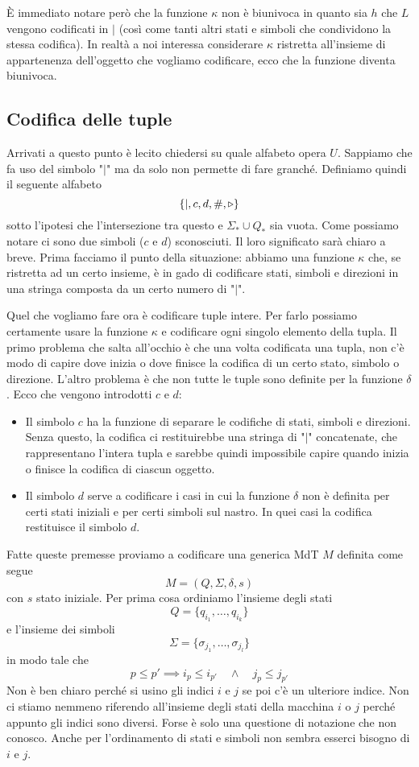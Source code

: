\`E immediato notare però che la funzione $\kappa$ non è
biunivoca in quanto sia $h$ che $L$ vengono codificati in $\mid$
(così come tanti altri stati e simboli che condividono la stessa
codifica). In realtà a noi interessa considerare $\kappa$
ristretta all'insieme di appartenenza dell'oggetto che vogliamo
codificare, ecco che la funzione diventa biunivoca.

\subsection{Codifica delle tuple}
Arrivati a questo punto è lecito chiedersi su quale alfabeto
opera $U$. Sappiamo che fa uso del simbolo "$\mid$" ma da solo
non permette di fare granché. Definiamo quindi il seguente
alfabeto
\[ \{ \mid, c, d, \#, \triangleright \} \]
sotto l'ipotesi che l'intersezione tra questo e
$\Sigma_* \cup Q_*$ sia vuota. Come possiamo notare ci sono due
simboli ($c$ e $d$) sconosciuti. Il loro significato sarà chiaro
a breve. Prima facciamo il punto della situazione: abbiamo una
funzione $\kappa$ che, se ristretta ad un certo insieme, è in
gado di codificare stati, simboli e direzioni in una stringa
composta da un certo numero di "$\mid$".

Quel che vogliamo fare ora è codificare tuple intere. Per farlo
possiamo certamente usare la funzione $\kappa$ e codificare ogni
singolo elemento della tupla. Il primo problema che salta
all'occhio è che una volta codificata una tupla, non c'è modo di
capire dove inizia o dove finisce la codifica di un certo stato,
simbolo o direzione. L'altro problema è che non tutte le tuple
sono definite per la funzione $\delta$. Ecco che vengono
introdotti $c$ e $d$:
\begin{itemize}
	\item Il simbolo $c$ ha la funzione di separare le codifiche
	      di stati, simboli e direzioni. Senza questo, la
	      codifica ci restituirebbe una stringa di "$\mid$"
	      concatenate, che rappresentano l'intera tupla e sarebbe
	      quindi impossibile capire quando inizia o finisce la
	      codifica di ciascun oggetto.
	\item Il simbolo $d$ serve a codificare i casi in cui
	      la funzione $\delta$ non è definita per certi stati
	      iniziali e per certi simboli sul nastro. In quei casi
	      la codifica restituisce il simbolo $d$.
\end{itemize}
Fatte queste premesse proviamo a codificare una generica MdT $M$
definita come segue
\[ M = (Q, \Sigma, \delta, s) \]
con $s$ stato iniziale. Per prima cosa ordiniamo l'insieme degli
stati
\[ Q = \{ q_{i_1}, \dots, q_{i_k} \} \]
e l'insieme dei simboli
\[ \Sigma = \{ \sigma_{j_1}, \dots, \sigma_{j_l} \} \]
in modo tale che
\[
	p \leq p' \implies i_p \leq i_{p'} \quad
	\land \quad j_p \leq j_{p'}
\]
Non è ben chiaro perché si usino gli indici $i$ e $j$ se poi c'è
un ulteriore indice. Non ci stiamo nemmeno riferendo all'insieme
degli stati della macchina $i$ o $j$ perché appunto gli indici
sono diversi. Forse è solo una questione di notazione che non
conosco. Anche per l'ordinamento di stati e simboli non sembra
esserci bisogno di $i$ e $j$.

